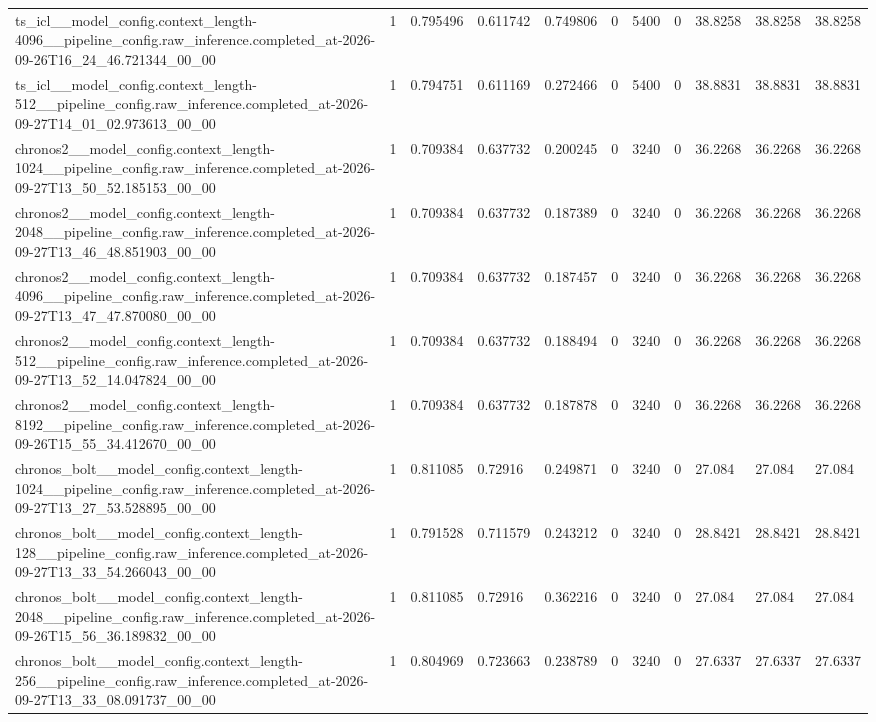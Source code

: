 \begin{tabular}{lllllllllll}
ts\_icl\_\_model\_config.context\_length-4096\_\_pipeline\_config.raw\_inference.completed\_at-2026-09-26T16\_24\_46.721344\_00\_00 & 1 & 0.795496 & 0.611742 & 0.749806 & 0 & 5400 & 0 & 38.8258 & 38.8258 & 38.8258 \\
ts\_icl\_\_model\_config.context\_length-512\_\_pipeline\_config.raw\_inference.completed\_at-2026-09-27T14\_01\_02.973613\_00\_00 & 1 & 0.794751 & 0.611169 & 0.272466 & 0 & 5400 & 0 & 38.8831 & 38.8831 & 38.8831 \\
chronos2\_\_model\_config.context\_length-1024\_\_pipeline\_config.raw\_inference.completed\_at-2026-09-27T13\_50\_52.185153\_00\_00 & 1 & 0.709384 & 0.637732 & 0.200245 & 0 & 3240 & 0 & 36.2268 & 36.2268 & 36.2268 \\
chronos2\_\_model\_config.context\_length-2048\_\_pipeline\_config.raw\_inference.completed\_at-2026-09-27T13\_46\_48.851903\_00\_00 & 1 & 0.709384 & 0.637732 & 0.187389 & 0 & 3240 & 0 & 36.2268 & 36.2268 & 36.2268 \\
chronos2\_\_model\_config.context\_length-4096\_\_pipeline\_config.raw\_inference.completed\_at-2026-09-27T13\_47\_47.870080\_00\_00 & 1 & 0.709384 & 0.637732 & 0.187457 & 0 & 3240 & 0 & 36.2268 & 36.2268 & 36.2268 \\
chronos2\_\_model\_config.context\_length-512\_\_pipeline\_config.raw\_inference.completed\_at-2026-09-27T13\_52\_14.047824\_00\_00 & 1 & 0.709384 & 0.637732 & 0.188494 & 0 & 3240 & 0 & 36.2268 & 36.2268 & 36.2268 \\
chronos2\_\_model\_config.context\_length-8192\_\_pipeline\_config.raw\_inference.completed\_at-2026-09-26T15\_55\_34.412670\_00\_00 & 1 & 0.709384 & 0.637732 & 0.187878 & 0 & 3240 & 0 & 36.2268 & 36.2268 & 36.2268 \\
chronos\_bolt\_\_model\_config.context\_length-1024\_\_pipeline\_config.raw\_inference.completed\_at-2026-09-27T13\_27\_53.528895\_00\_00 & 1 & 0.811085 & 0.72916 & 0.249871 & 0 & 3240 & 0 & 27.084 & 27.084 & 27.084 \\
chronos\_bolt\_\_model\_config.context\_length-128\_\_pipeline\_config.raw\_inference.completed\_at-2026-09-27T13\_33\_54.266043\_00\_00 & 1 & 0.791528 & 0.711579 & 0.243212 & 0 & 3240 & 0 & 28.8421 & 28.8421 & 28.8421 \\
chronos\_bolt\_\_model\_config.context\_length-2048\_\_pipeline\_config.raw\_inference.completed\_at-2026-09-26T15\_56\_36.189832\_00\_00 & 1 & 0.811085 & 0.72916 & 0.362216 & 0 & 3240 & 0 & 27.084 & 27.084 & 27.084 \\
chronos\_bolt\_\_model\_config.context\_length-256\_\_pipeline\_config.raw\_inference.completed\_at-2026-09-27T13\_33\_08.091737\_00\_00 & 1 & 0.804969 & 0.723663 & 0.238789 & 0 & 3240 & 0 & 27.6337 & 27.6337 & 27.6337 \\

\end{tabular}

